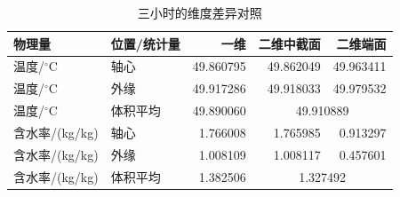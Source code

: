\begin{table}[H]\centering\small
\caption{三小时的维度差异对照}\label{tab:q2_dimension}
\begin{tabular}{llrrr}
\toprule
物理量 & 位置/统计量 & 一维 & 二维中截面 & 二维端面\\\midrule
温度/$^\circ$C & 轴心 & 49.860795 & 49.862049 & 49.963411\\
温度/$^\circ$C & 外缘 & 49.917286 & 49.918033 & 49.979532\\
温度/$^\circ$C & 体积平均 & 49.890060 & \multicolumn{2}{c}{49.910889}\\
含水率/(kg/kg) & 轴心 & 1.766008 & 1.765985 & 0.913297\\
含水率/(kg/kg) & 外缘 & 1.008109 & 1.008117 & 0.457601\\
含水率/(kg/kg) & 体积平均 & 1.382506 & \multicolumn{2}{c}{1.327492}\\
\bottomrule\end{tabular}\end{table}
